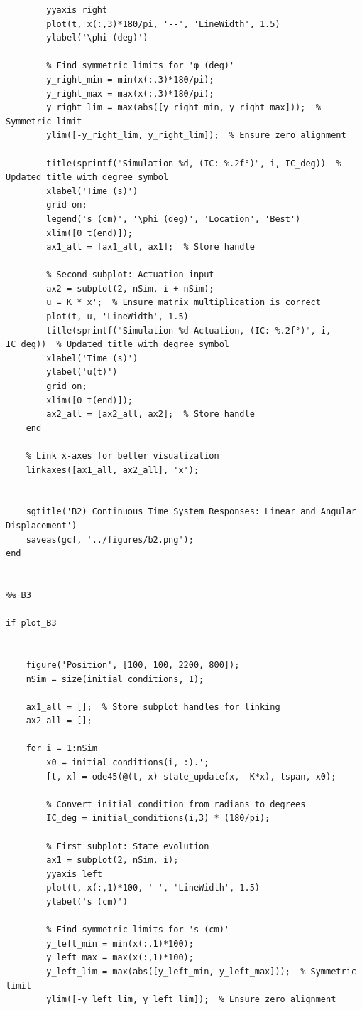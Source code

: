 \documentclass{article}
\begin{document}
\begin{verbatim}
        yyaxis right
        plot(t, x(:,3)*180/pi, '--', 'LineWidth', 1.5)
        ylabel('\phi (deg)')
    
        % Find symmetric limits for 'φ (deg)'
        y_right_min = min(x(:,3)*180/pi);
        y_right_max = max(x(:,3)*180/pi);
        y_right_lim = max(abs([y_right_min, y_right_max]));  % Symmetric limit
        ylim([-y_right_lim, y_right_lim]);  % Ensure zero alignment
    
        title(sprintf("Simulation %d, (IC: %.2f°)", i, IC_deg))  % Updated title with degree symbol
        xlabel('Time (s)')
        grid on;
        legend('s (cm)', '\phi (deg)', 'Location', 'Best')
        xlim([0 t(end)]); 
        ax1_all = [ax1_all, ax1];  % Store handle
    
        % Second subplot: Actuation input
        ax2 = subplot(2, nSim, i + nSim);
        u = K * x';  % Ensure matrix multiplication is correct
        plot(t, u, 'LineWidth', 1.5)
        title(sprintf("Simulation %d Actuation, (IC: %.2f°)", i, IC_deg))  % Updated title with degree symbol
        xlabel('Time (s)')
        ylabel('u(t)')
        grid on;
        xlim([0 t(end)]);
        ax2_all = [ax2_all, ax2];  % Store handle
    end
    
    % Link x-axes for better visualization
    linkaxes([ax1_all, ax2_all], 'x');


    sgtitle('B2) Continuous Time System Responses: Linear and Angular Displacement')
    saveas(gcf, '../figures/b2.png');
end


%% B3

if plot_B3


    figure('Position', [100, 100, 2200, 800]);
    nSim = size(initial_conditions, 1);
    
    ax1_all = [];  % Store subplot handles for linking
    ax2_all = [];
    
    for i = 1:nSim
        x0 = initial_conditions(i, :).';
        [t, x] = ode45(@(t, x) state_update(x, -K*x), tspan, x0);
    
        % Convert initial condition from radians to degrees
        IC_deg = initial_conditions(i,3) * (180/pi);
    
        % First subplot: State evolution
        ax1 = subplot(2, nSim, i);
        yyaxis left
        plot(t, x(:,1)*100, '-', 'LineWidth', 1.5)
        ylabel('s (cm)')
    
        % Find symmetric limits for 's (cm)'
        y_left_min = min(x(:,1)*100);
        y_left_max = max(x(:,1)*100);
        y_left_lim = max(abs([y_left_min, y_left_max]));  % Symmetric limit
        ylim([-y_left_lim, y_left_lim]);  % Ensure zero alignment
    

\end{verbatim}
\end{document}
